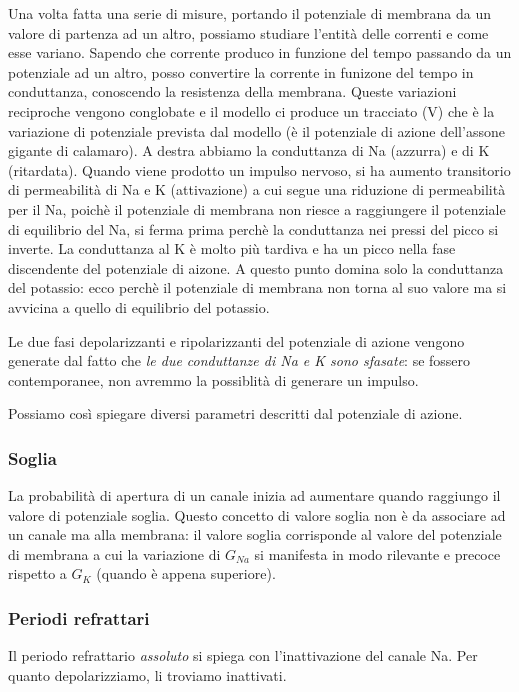 \documentclass[a4paper,12pt]{article}
\begin{document}
Una volta fatta una serie di misure, portando il potenziale di membrana da un valore di partenza ad un altro, possiamo studiare l'entità delle correnti e come esse variano. Sapendo che corrente produco in funzione del tempo passando da un potenziale ad un altro, posso convertire la corrente in funizone del tempo in conduttanza, conoscendo la resistenza della membrana. Queste variazioni reciproche vengono conglobate e il modello ci produce un tracciato (V) che è la variazione di potenziale prevista dal modello (è il potenziale di azione dell'assone gigante di calamaro). A destra abbiamo la conduttanza di Na (azzurra) e di K (ritardata). 
Quando viene prodotto un impulso nervoso, si ha aumento transitorio di permeabilità di Na e K (attivazione) a cui segue una riduzione di permeabilità per il Na, poichè il potenziale di membrana non riesce a raggiungere il potenziale di equilibrio del Na, si ferma prima perchè la conduttanza nei pressi del picco si inverte. La conduttanza al K è molto più tardiva e ha un picco nella fase discendente del potenziale di aizone. A questo punto domina solo la conduttanza del potassio: ecco perchè il potenziale di membrana non torna al suo valore ma si avvicina a quello di equilibrio del potassio.

Le due fasi depolarizzanti e ripolarizzanti del potenziale di azione vengono generate dal fatto che \emph{le due conduttanze di Na e K sono sfasate}: se fossero contemporanee, non avremmo la possiblità di generare un impulso.

Possiamo così spiegare diversi parametri descritti dal potenziale di azione.

\subsubsection{Soglia}
La probabilità di apertura di un canale inizia ad aumentare quando raggiungo il valore di potenziale soglia. Questo concetto di valore soglia non è da associare ad un canale ma alla membrana: il valore soglia corrisponde al valore del potenziale di membrana a cui la variazione di $G_{Na}$ si manifesta in modo rilevante e precoce rispetto a $G_{K}$ (quando è appena superiore).

\subsubsection{Periodi refrattari}
Il periodo refrattario \emph{assoluto} si spiega con l'inattivazione del canale Na. Per quanto depolarizziamo, li troviamo inattivati.
\end{document}
